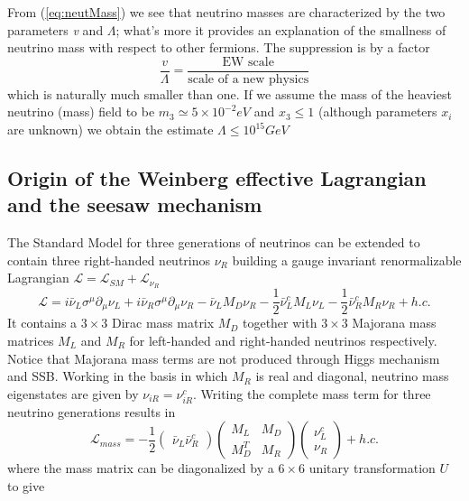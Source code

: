 \documentclass{subnucbo}
\begin{document}
From (\ref{eq:neutMass}) we see that neutrino masses are characterized by the two parameters \emph{v} and $\Lambda$; what's more it provides an explanation of the smallness of neutrino mass with respect to other fermions. The suppression is by a factor
\begin{equation}
\frac{v}{\Lambda}=\frac{\text{EW scale}}{\text{scale of a new physics}}
\end{equation}
which is naturally much smaller than one.
If we assume the mass of the heaviest neutrino (mass) field to be $m_3\simeq5\times10^{-2}eV$ and $x_3\leq1$ (although parameters $x_i$ are unknown) we obtain the estimate $\Lambda\leq10^{15}GeV$

\subsection{Origin of the Weinberg effective Lagrangian and the seesaw mechanism}
The Standard Model for three generations of neutrinos can be extended to contain three right-handed neutrinos $\nu_R$ building a gauge invariant renormalizable Lagrangian $\mathcal{L}=\mathcal{L}_{SM}+\mathcal{L}_{\nu_R}$ 
\begin{equation}
\label{eq:renormLag}
\mathcal{L}=i\bar{\nu}_L\sigma^{\mu}\partial_{\mu}\nu_L+i\bar{\nu}_R\sigma^{\mu}\partial_{\mu}\nu_R-\bar{\nu}_LM_D\nu_R-\frac{1}{2}\bar{\nu}^c_LM_L\nu_L-\frac{1}{2}\bar{\nu}_R^cM_R\nu_R+h.c.
\end{equation}
It contains a $3\times3$ Dirac mass matrix $M_D$ together with $3\times3$ Majorana mass matrices $M_L$ and $M_R$ for left-handed and right-handed neutrinos respectively. Notice that Majorana mass terms are not produced through Higgs mechanism and SSB. Working in the basis in which $M_R$ is real and diagonal, neutrino mass eigenstates are given by $\nu_{iR}=\nu_{iR}^c$. 
Writing the complete mass term for three neutrino generations results in 
\begin{equation}
\mathcal{L}_{mass}=-\frac{1}{2}\begin{pmatrix}\bar{\nu}_L \bar{\nu}_R^c\end{pmatrix}\begin{pmatrix}M_L & M_D\\ M_D^T & M_R\end{pmatrix}\begin{pmatrix}\nu_L^c\\ \nu_R\end{pmatrix}+h.c.
\end{equation}
where the mass matrix can be diagonalized by a $6\times6$ unitary transformation $U$ to give 
\end{document}
